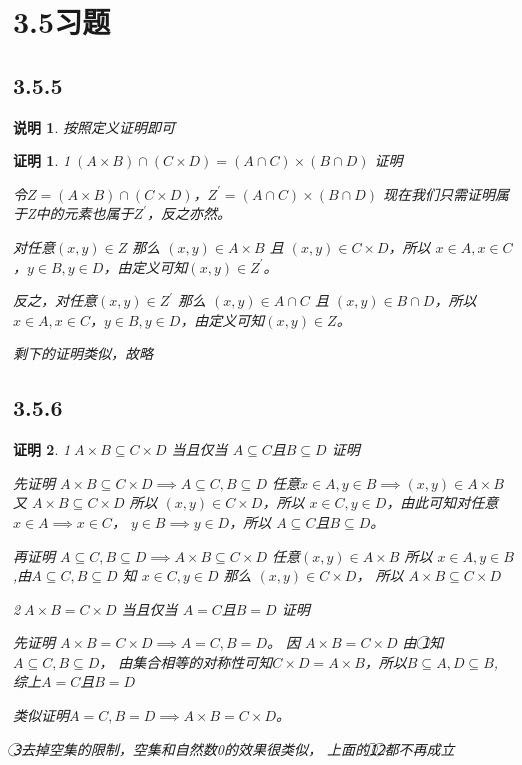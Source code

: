 \documentclass{article}
\theoremstyle{mystyle}
\newtheorem*{zremark}{说明}
\theoremstyle{zproofstyle}
\newtheorem*{zproof}{证明}
\begin{document}
\section{3.5习题}
\subsection*{3.5.5}

\begin{zgraytheorem}
  \begin{zremark}
    按照定义证明即可
  \end{zremark}
\end{zgraytheorem}
\begin{zproof}
  \textcircled{1}$(A \times B) \cap (C \times D) = (A \cap C) \times (B \cap D)$ 证明

  令$Z = (A \times B) \cap (C \times D)$，$Z^\prime=(A \cap C) \times (B \cap D)$
  现在我们只需证明属于Z中的元素也属于$Z^\prime$，反之亦然。

  对任意$(x,y) \in Z$ 那么 $(x,y)\in A \times B$ 且 $(x,y)\in C \times D$，所以
  $x \in A , x \in C$，$y \in B , y \in D$，由定义可知$(x,y) \in Z^\prime$。

  反之，对任意$(x,y) \in Z^\prime$ 那么 $(x,y)\in A \cap C$ 且 $(x,y)\in B \cap D$，所以
  $x \in A , x \in C$，$y \in B , y \in D$，由定义可知$(x,y) \in Z$。

  剩下的证明类似，故略
\end{zproof}

\subsection*{3.5.6}
\begin{zproof}
  \textcircled{1}$A \times B \subseteq C \times D$ 当且仅当 $A \subseteq C$且$B \subseteq D$ 证明

  先证明 $A \times B \subseteq C \times D \implies A \subseteq C,B \subseteq D$
  任意$x \in A, y \in B \implies (x,y) \in A \times B$ 又 $A \times B \subseteq C \times D$
  所以 $(x,y) \in C \times D$，所以 $x \in C , y \in D$，由此可知对任意$x \in A \implies x \in C$，
  $y \in B \implies y \in D$，所以 $A \subseteq C$且$B \subseteq D$。

  再证明 $A \subseteq C,B \subseteq D \implies A \times B \subseteq C \times D$ 任意$(x,y) \in A \times B$
  所以 $x \in A , y \in B$,由$A \subseteq C,B \subseteq D$ 知 $x \in C , y \in D$ 那么 $(x,y) \in C \times D$，
  所以 $A \times B \subseteq C \times D$

  \textcircled{2}$A \times B = C \times D$ 当且仅当 $A = C$且$B = D$ 证明

  先证明 $A \times B = C \times D \implies A = C,B = D$。
  因 $A \times B = C \times D$ 由 \textcircled{1}知$A \subseteq C,B \subseteq D$，
  由集合相等的对称性可知$C \times D = A \times B$，所以$B \subseteq A,D \subseteq B$,
  综上$A = C$且$B = D$

  类似证明$A = C,B = D \implies A \times B = C \times D$。

  \textcircled{3}去掉空集的限制，空集和自然数0的效果很类似，
  上面的\textcircled{1}\textcircled{2}都不再成立
\end{zproof}
\end{document}
